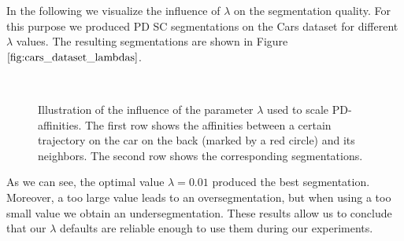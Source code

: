 In the following we visualize the influence of $\lambda$ on the segmentation quality. For this purpose we produced PD SC segmentations on the Cars dataset for different $\lambda$ values. The resulting segmentations are shown in Figure $\ref{fig:cars_dataset_lambdas}$.
\begin{figure}[H]
\begin{center}
~
\end{center}
\caption[Influence varying $\lambda$]{Illustration of the influence of the parameter $\lambda$ used to scale PD-affinities. The first row shows the affinities between a certain trajectory on the car on the back (marked by a red circle) and its neighbors. The second row shows the corresponding segmentations.}
\label{fig:cars_dataset_lambdas}
\end{figure}
As we can see, the optimal value $\lambda = 0.01$ produced the best segmentation. Moreover, a too large value leads to an oversegmentation, but when using a too small value we obtain an undersegmentation. These results allow us to conclude that our $\lambda$ defaults are reliable enough to use them during our experiments.

